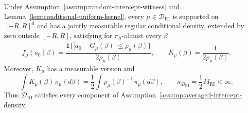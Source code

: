 \begin{proposition}
\label{prop:random-intercept-envelope}
Under Assumption~\ref{assump:random-intercept-witness} and
Lemma~\ref{lem:conditional-uniform-kernel}, every
$\mu\in\mathcal D_{\mathrm{RI}}$ is supported on $[-R,R]^d$ and has a
jointly measurable regular conditional density, extended by zero outside
$[-R,R]$, satisfying for $\pi_\mu$-almost every $\beta$
\[
f_\mu(a_0\mid\beta)
=\frac{\mathbf1\{|a_0-G_\mu(\beta)|\leq\rho_\mu(\beta)\}}
       {2\rho_\mu(\beta)},
\qquad
K_\mu(\beta)=\frac{1}{2\rho_\mu(\beta)}.
\]
Moreover, $K_\mu$ has a measurable version and
\[
\int K_\mu(\beta)\,\pi_\mu(d\beta)
=\frac12\int\rho_\mu(\beta)^{-1}\,\pi_\mu(d\beta),
\qquad
\bar\kappa_{\mathcal D_{\mathrm{RI}}}
=\frac12M_{\mathrm{RI}}<\infty.
\]
Thus $\mathcal D_{\mathrm{RI}}$ satisfies every component of
Assumption~\ref{assump:averaged-intercept-density}.
\end{proposition}

